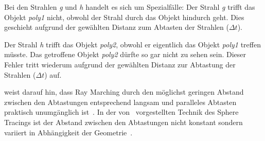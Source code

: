 Bei den Strahlen \textit{g} und \textit{h} handelt es sich um
Spezialfälle: Der Strahl \textit{g} trifft das Objekt \textit{poly1}
nicht, obwohl der Strahl durch das Objekt hindurch geht. Dies geschieht
aufgrund der gewählten Distanz zum Abtasten der Strahlen ($\Delta t$).

Der Strahl \textit{h} trifft das Objekt \textit{poly2}, obwohl er
eigentlich das Objekt \textit{poly1} treffen müsste. Das getroffene
Objekt \textit{poly2} dürfte so gar nicht zu sehen sein. Dieser Fehler
tritt wiederum aufgrund der gewählten Distanz zur Abtastung der
Strahlen ($\Delta t$) auf.

\citeauthor{hart_sphere_1994} weist darauf hin, dass Ray Marching durch
den möglichst geringen Abstand zwischen den Abtastungen entsprechend
langsam und paralleles Abtasten praktisch unumgänglich ist~\parencite[S.
528]{hart_sphere_1994}. In der von~\citeauthor{hart_sphere_1994} vorgestellten
Technik des Sphere Tracings ist der Abstand zwischen den Abtastungen
nicht konstant sondern variiert in Abhängigkeit der
Geometrie~\parencite[S. 538 bis 540]{hart_sphere_1994}.
